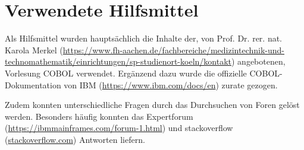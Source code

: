 \chapter{Verwendete Hilfsmittel}\label{ch:verwendete-hilfsmittel}

Als Hilfsmittel wurden hauptsächlich die Inhalte der, von Prof. Dr. rer. nat. Karola Merkel (\url{https://www.fh-aachen.de/fachbereiche/medizintechnik-und-technomathematik/einrichtungen/sp-studienort-koeln/kontakt}) angebotenen, Vorlesung \glqq COBOL\grqq{} verwendet.
Ergänzend dazu wurde die offizielle COBOL-Dokumentation von IBM (\url{https://www.ibm.com/docs/en}) zurate gezogen.

Zudem konnten unterschiedliche Fragen durch das Durchsuchen von Foren gelöst werden.
Besonders häufig konnten das \glqq Expertforum\grqq{} (\url{https://ibmmainframes.com/forum-1.html}) und \glqq stackoverflow\grqq{} (\url{stackoverflow.com}) Antworten liefern.